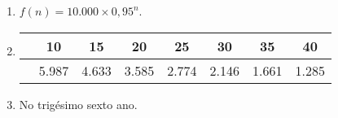 \documentclass[10 pt,usenames,dvipsnames, oneside]{article}
\begin{document}
\ifdefined\prof
\begin{solucao}

\begin{enumerate}

	\item{}
	$f(n)=10.000 \times 0,95^{n}$.

	\item{}
	{
	\begin{tabu} to 
	\hline
	 & 10 & 15 & 20 & 25 & 30 & 35 & 40 \\
	\hline
	 & 5.987 & 4.633 & 3.585 & 2.774 & 2.146 & 1.661 & 1.285 \\
	\hline
	\end{tabu}
	}

	\item{}
	No trigésimo sexto ano.

	\end{enumerate}

\end{solucao}
\fi
\end{document}
